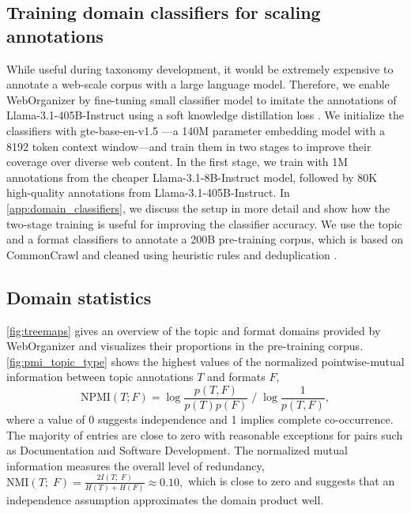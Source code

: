 \vspace{-1em}
\subsection{Training domain classifiers for scaling annotations}

While useful during taxonomy development, it would be extremely expensive to annotate a web-scale corpus with a large language model.
Therefore, we enable WebOrganizer by fine-tuning small classifier model
to imitate the annotations of Llama-3.1-405B-Instruct using a soft knowledge distillation loss \citep{hinton2025distilling}.
We initialize the classifiers with \mbox{gte-base-en-v1.5} \citep{li2023gte}---a 140M parameter embedding model with a 8192 token context window---and train them in two stages to improve their coverage over diverse web content. 
In the first stage, we train with 1M annotations from the cheaper Llama-3.1-8B-Instruct model, followed by 80K high-quality annotations from Llama-3.1-405B-Instruct.
In \autoref{app:domain_classifiers}, we discuss the setup in more detail and show how the two-stage training is useful for improving the classifier accuracy. 
We use the topic and a format classifiers to annotate a 200B pre-training corpus, which is based on CommonCrawl and cleaned using heuristic rules \citep{penedo2023refinedweb} and deduplication \citep{soldaini-etal-2024-dolma}.


\subsection{Domain statistics} \label{sec:domain_statistics}
\ificml\else
\begin{minipage}[t]{0.5\linewidth}%
\fi
\autoref{fig:treemaps} gives an overview of the topic and format domains provided by WebOrganizer and visualizes their proportions in the pre-training corpus.
\autoref{fig:pmi_topic_type} shows the highest values of the normalized pointwise-mutual information between topic annotations $T$ and formats $F$,
$$\text{NPMI}(T; F) = {\log \frac{p(T, F)}{p(T)p(F)}}\;/\;{\log \frac{1}{p(T, F)}},$$ where a value of 0 suggests independence and 1 implies complete co-occurrence.
The majority of entries are close to zero with reasonable exceptions for pairs such as {\aformat Documentation} and {\atopic Software Development}.
The normalized mutual information measures the overall level of redundancy, $\text{NMI}(T;\;F) = \frac{2I(T;\; F)}{H(T)+H(F)} \approx 0.10,$
which is close to zero and suggests that an independence assumption approximates the domain product well.
\ificml

\else
\end{minipage}\hfill
\noindent\begin{minipage}[t]{0.45\linewidth}

\end{minipage}
\fi

